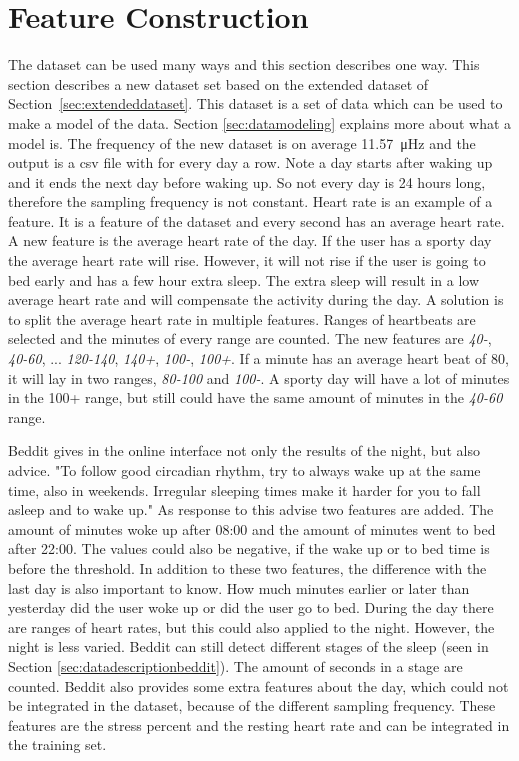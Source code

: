 	\section{Feature Construction}
		\label{sec:feature}
				The dataset can be used many ways and this section describes one way. This section describes a new dataset set based on the extended dataset of Section~\ref{sec:extendeddataset}. This dataset is a set of data which can be used to make a model of the data. Section \ref{sec:datamodeling} explains more about what a model is. The frequency of the new dataset is on average \SI{11.57}{\micro\hertz} and the output is a csv file with for every day a row. Note a day starts after waking up and it ends the next day before waking up. So not every day is 24 hours long, therefore the sampling frequency is not constant. Heart rate is an example of a feature. It is a feature of the dataset and every second has an average heart rate. A new feature is the average heart rate of the day. If the user has a sporty day the average heart rate will rise. However, it will not rise if the user is going to bed early and has a few hour extra sleep. The extra sleep will result in a low average heart rate and will compensate the activity during the day. A solution is to split the average heart rate in multiple features. Ranges of heartbeats are selected and the minutes of every range are counted. The new features are \emph{40-}, \emph{40-60}, ... \emph{120-140}, \emph{140+}, \emph{100-}, \emph{100+}. If a minute has an average heart beat of 80, it will lay in two ranges, \emph{80-100} and \emph{100-}. A sporty day will have a lot of minutes in the 100+ range, but still could have the same amount of minutes in the \emph{40-60} range. 

			Beddit gives in the online interface not only the results of the night, but also advice. "To follow good circadian rhythm, try to always wake up at the same time, also in weekends. Irregular sleeping times make it harder for you to fall asleep and to wake up." As response to this advise two features are added. The amount of minutes woke up after 08:00 and the amount of minutes went to bed after 22:00. The values could also be negative, if the wake up or to bed time is before the threshold. In addition to these two features, the difference with the last day is also important to know. How much minutes earlier or later than yesterday did the user woke up or did the user go to bed. 
			During the day there are ranges of heart rates, but this could also applied to the night. However, the night is less varied. Beddit can still detect different stages of the sleep (seen in Section \ref{sec:datadescriptionbeddit}). The amount of seconds in a stage are counted.
			 Beddit also provides some extra features about the day, which could not be integrated in the dataset, because of the different sampling frequency. These features are the stress percent and the resting heart rate and can be integrated in the training set.
				

